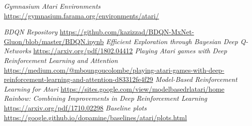 \documentclass{article}
\begin{document}
\clearpage
\begin{thebibliography}{99}

\emph{Gymnasium Atari Environments} \url{https://gymnasium.farama.org/environments/atari/}

\emph{BDQN Repository} \url{https://github.com/kazizzad/BDQN-MxNet-Gluon/blob/master/BDQN.ipynb}
\newline
{}
\emph{Efficient Exploration through Bayesian Deep Q-Networks} \url{https://arxiv.org/pdf/1802.04412}
\emph{Playing Atari games with Deep Reinforcement Learning and Attention} \url{https://medium.com/@mboungoucolombe/playing-atari-games-with-deep-reinforcement-learning-and-attention-d83312fe4f29}
\emph{Model-Based Reinforcement Learning for Atari} \url{https://sites.google.com/view/modelbasedrlatari/home}
\emph{Rainbow: Combining Improvements in Deep Reinforcement Learning} \url{https://arxiv.org/pdf/1710.02298}
\emph{Baseline plots} \url{https://google.github.io/dopamine/baselines/atari/plots.html}

\end{thebibliography}
\end{document}
